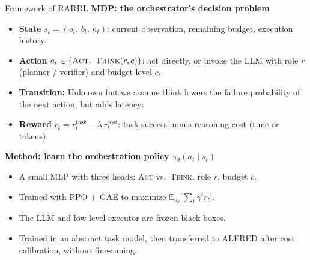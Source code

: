 \documentclass[aspectratio=169]{beamer}
\begin{document}
\begin{frame}{Framework of RARRL}
\textbf{MDP: the orchestrator's decision problem}
\begin{itemize}
  \item \textbf{State} $s_t = (o_t,\, b_t,\, h_t)$: current observation, remaining budget, execution history.
  \item \textbf{Action} $a_t \in \{\textsc{Act},\ \textsc{Think}(r, c)\}$: act directly, or invoke the LLM with role $r$ (planner / verifier) and budget level $c$.
  \item \textbf{Transition:} Unknown but we assume think lowers the failure probability of the next action, but adds latency:
  \item \textbf{Reward} $r_t = r_t^{\text{task}} - \lambda\, r_t^{\text{cost}}$: task success minus reasoning cost (time or tokens).
\end{itemize}
\medskip
\textbf{Method: learn the orchestration policy $\pi_\theta(a_t \mid s_t)$}
\begin{itemize}
  \item A small MLP with three heads: \textsc{Act} vs.\ \textsc{Think}, role $r$, budget $c$.
  \item Trained with PPO + GAE to maximize $\mathbb{E}_{\pi_\theta}\bigl[\sum_{t} \gamma^t r_t\bigr]$.
  \item The LLM and low-level executor are frozen black boxes.
  \item Trained in an abstract task model, then transferred to ALFRED after cost calibration, without fine-tuning.
\end{itemize}
\end{frame}
\end{document}
